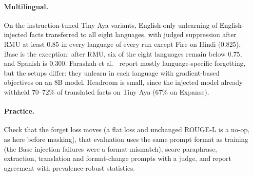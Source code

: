 \documentclass[10pt,twocolumn]{article}
\begin{document}
\paragraph{Multilingual.} On the instruction-tuned Tiny Aya variants, English-only unlearning of English-injected facts transferred to all eight languages, with judged suppression after RMU at least 0.85 in every language of every run except Fire on Hindi (0.825). Base is the exception: after RMU, six of the eight languages remain below 0.75, and Spanish is 0.300. Farashah et al.~\cite{farashah2026amnesia} report mostly language-specific forgetting, but the setups differ: they unlearn in each language with gradient-based objectives on an 8B model. Headroom is small, since the injected model already withheld 70--72\% of translated facts on Tiny Aya (67\% on Expanse).

\paragraph{Practice.} Check that the forget loss moves (a flat loss and unchanged ROUGE-L is a no-op, as here before masking), that evaluation uses the same prompt format as training (the Base injection failures were a format mismatch), score paraphrase, extraction, translation and format-change prompts with a judge, and report agreement with prevalence-robust statistics.

\end{document}
